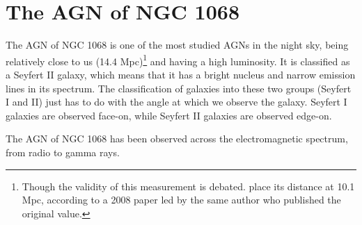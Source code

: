 \section{The AGN of NGC 1068}

The AGN of NGC 1068 is one of the most studied AGNs in the night sky, being relatively close to us (14.4 Mpc)\footnote{Though the validity of this measurement is debated. \citet{padovani2024highenergyneutrinosvicinitysupermassive} place its distance at 10.1 Mpc, according to a 2008 paper led by the same author who published the original value.} and having a high luminosity. It is classified as a Seyfert II galaxy, which means that it has a bright nucleus and narrow emission lines in its spectrum. The classification of galaxies into these two groups (Seyfert I and II) just has to do with the angle at which we observe the galaxy. Seyfert I galaxies are observed face-on, while Seyfert II galaxies are observed edge-on.

The AGN of NGC 1068 has been observed across the electromagnetic spectrum, from radio to gamma rays.  






